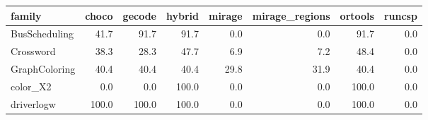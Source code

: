 \begin{table}[t]
{\begin{tabular}{lrrrrrrr}
\toprule
family & choco & gecode & hybrid & mirage & mirage\_regions & ortools & runcsp \\
\midrule
BusScheduling & 41.7 & 91.7 & 91.7 & 0.0 & 0.0 & 91.7 & 0.0 \\
Crossword & 38.3 & 28.3 & 47.7 & 6.9 & 7.2 & 48.4 & 0.0 \\
GraphColoring & 40.4 & 40.4 & 40.4 & 29.8 & 31.9 & 40.4 & 0.0 \\
color_X2 & 0.0 & 0.0 & 100.0 & 0.0 & 0.0 & 100.0 & 0.0 \\
driverlogw & 100.0 & 100.0 & 100.0 & 0.0 & 0.0 & 100.0 & 0.0 \\
\bottomrule
\end{tabular}}
{}
\end{table}
